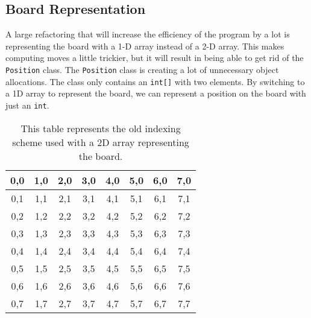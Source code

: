 \documentclass[sigconf]{acmart}
\begin{document}
\subsection{Board Representation} \label{sec:board}
A large refactoring that will increase the efficiency of the program by a lot is representing the board with a 1-D array instead of a 2-D array.
This makes computing moves a little trickier, but it will result in being able to get rid of the \texttt{Position} class.
The \texttt{Position} class is creating a lot of unnecessary object allocations.
The class only contains an \texttt{int[]} with two elements.
By switching to a 1D array to represent the board, we can represent a position on the board with just an \texttt{int}.
\begin{table}[H]
    \renewcommand{\arraystretch}{1.5}
    \setlength{\arrayrulewidth}{1pt}
    \setlength{\tabcolsep}{4pt}
    \begin{tabular}{|c|c|c|c|c|c|c|c|}
        \hline
        0,0  & 1,0  & 2,0  & 3,0  & 4,0  & 5,0  & 6,0  & 7,0  \\
        \hline
        0,1  & 1,1  & 2,1  & 3,1  & 4,1  & 5,1  & 6,1  & 7,1  \\
        \hline
        0,2  & 1,2  & 2,2  & 3,2  & 4,2  & 5,2  & 6,2  & 7,2  \\
        \hline
        0,3  & 1,3  & 2,3  & 3,3  & 4,3  & 5,3  & 6,3  & 7,3  \\
        \hline
        0,4  & 1,4  & 2,4  & 3,4  & 4,4  & 5,4  & 6,4  & 7,4  \\
        \hline
        0,5  & 1,5  & 2,5  & 3,5  & 4,5  & 5,5  & 6,5  & 7,5  \\
        \hline
        0,6  & 1,6  & 2,6  & 3,6  & 4,6  & 5,6  & 6,6  & 7,6  \\
        \hline
        0,7  & 1,7  & 2,7  & 3,7  & 4,7  & 5,7  & 6,7  & 7,7  \\
        \hline
    \end{tabular}
    \caption{This table represents the old indexing scheme used with a 2D array representing the board.}
    \label{tab:example_table}
\end{table} 
\end{document}
